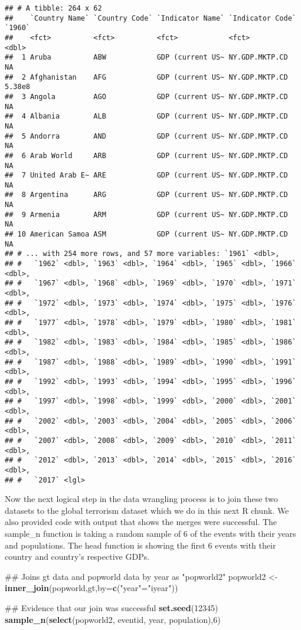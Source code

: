 \documentclass[11pt,letterpaper,]{article}
\newenvironment{Shaded}{\begin{snugshade}}{\end{snugshade}}
\newcommand{\KeywordTok}[1]{\textcolor[rgb]{0.13,0.29,0.53}{\textbf{{#1}}}}
\newcommand{\DataTypeTok}[1]{\textcolor[rgb]{0.13,0.29,0.53}{{#1}}}
\newcommand{\DecValTok}[1]{\textcolor[rgb]{0.00,0.00,0.81}{{#1}}}
\newcommand{\StringTok}[1]{\textcolor[rgb]{0.31,0.60,0.02}{{#1}}}
\newcommand{\NormalTok}[1]{{#1}}
\theoremstyle{definition}
\theoremstyle{definition}
\theoremstyle{definition}
\theoremstyle{remark}
\begin{document}
\begin{verbatim}
## # A tibble: 264 x 62
##    `Country Name` `Country Code` `Indicator Name` `Indicator Code`  `1960`
##    <fct>          <fct>          <fct>            <fct>              <dbl>
##  1 Aruba          ABW            GDP (current US~ NY.GDP.MKTP.CD   NA     
##  2 Afghanistan    AFG            GDP (current US~ NY.GDP.MKTP.CD    5.38e8
##  3 Angola         AGO            GDP (current US~ NY.GDP.MKTP.CD   NA     
##  4 Albania        ALB            GDP (current US~ NY.GDP.MKTP.CD   NA     
##  5 Andorra        AND            GDP (current US~ NY.GDP.MKTP.CD   NA     
##  6 Arab World     ARB            GDP (current US~ NY.GDP.MKTP.CD   NA     
##  7 United Arab E~ ARE            GDP (current US~ NY.GDP.MKTP.CD   NA     
##  8 Argentina      ARG            GDP (current US~ NY.GDP.MKTP.CD   NA     
##  9 Armenia        ARM            GDP (current US~ NY.GDP.MKTP.CD   NA     
## 10 American Samoa ASM            GDP (current US~ NY.GDP.MKTP.CD   NA     
## # ... with 254 more rows, and 57 more variables: `1961` <dbl>,
## #   `1962` <dbl>, `1963` <dbl>, `1964` <dbl>, `1965` <dbl>, `1966` <dbl>,
## #   `1967` <dbl>, `1968` <dbl>, `1969` <dbl>, `1970` <dbl>, `1971` <dbl>,
## #   `1972` <dbl>, `1973` <dbl>, `1974` <dbl>, `1975` <dbl>, `1976` <dbl>,
## #   `1977` <dbl>, `1978` <dbl>, `1979` <dbl>, `1980` <dbl>, `1981` <dbl>,
## #   `1982` <dbl>, `1983` <dbl>, `1984` <dbl>, `1985` <dbl>, `1986` <dbl>,
## #   `1987` <dbl>, `1988` <dbl>, `1989` <dbl>, `1990` <dbl>, `1991` <dbl>,
## #   `1992` <dbl>, `1993` <dbl>, `1994` <dbl>, `1995` <dbl>, `1996` <dbl>,
## #   `1997` <dbl>, `1998` <dbl>, `1999` <dbl>, `2000` <dbl>, `2001` <dbl>,
## #   `2002` <dbl>, `2003` <dbl>, `2004` <dbl>, `2005` <dbl>, `2006` <dbl>,
## #   `2007` <dbl>, `2008` <dbl>, `2009` <dbl>, `2010` <dbl>, `2011` <dbl>,
## #   `2012` <dbl>, `2013` <dbl>, `2014` <dbl>, `2015` <dbl>, `2016` <dbl>,
## #   `2017` <lgl>
\end{verbatim}

Now the next logical step in the data wrangling process is to join these
two datasets to the global terrorism dataset which we do in this next R
chunk. We also provided code with output that shows the merges were
successful. The sample\_n function is taking a random sample of 6 of the
events with their years and populations. The head function is showing
the first 6 events with their country and country's respective GDPs.

\begin{Shaded}
\begin{Highlighting}[]
\NormalTok{## Joins gt data and popworld data by year as "popworld2"}
\NormalTok{popworld2 <-}\StringTok{ }\KeywordTok{inner_join}\NormalTok{(popworld,gt,}\DataTypeTok{by=}\KeywordTok{c}\NormalTok{(}\StringTok{"year"}\NormalTok{=}\StringTok{"iyear"}\NormalTok{))}

\NormalTok{## Evidence that our join was successful}
\KeywordTok{set.seed}\NormalTok{(}\DecValTok{12345}\NormalTok{)}
\KeywordTok{sample_n}\NormalTok{(}\KeywordTok{select}\NormalTok{(popworld2, eventid, year, population),}\DecValTok{6}\NormalTok{)}
\end{Highlighting}
\end{Shaded}
\end{document}
